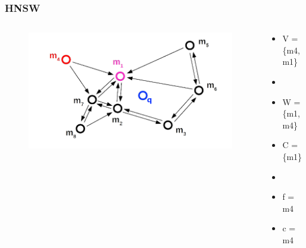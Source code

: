 \documentclass{beamer}
\begin{document}
	\begin{frame}
		\frametitle{HNSW}
		\begin{columns}[T] %
			\begin{column}{.6\textwidth}
				\begin{figure}
					\includegraphics[scale=0.3]{figures/HNSW_b3.png}
				\end{figure}
			\end{column}%
			\hfill%
			\begin{column}{.4\textwidth}
				\begin{itemize}
					\item V = \{m4,m1\}
					\item[]
					\item W = \{m1,m4\}
					\item C = \{m1\}
					\item[]
					\item f = m4
					\item c = m4
				\end{itemize}
			\end{column}%
		\end{columns}
	\end{frame}
\end{document}
